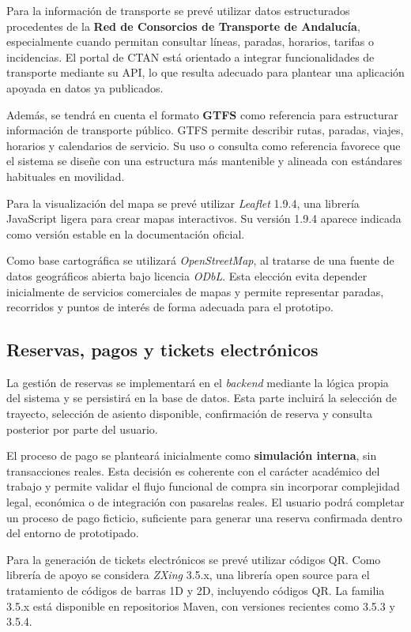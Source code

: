 Para la información de transporte se prevé utilizar datos estructurados procedentes de la \textbf{Red de Consorcios de Transporte de Andalucía}, especialmente cuando permitan consultar líneas, paradas, horarios, tarifas o incidencias. El portal de CTAN está orientado a integrar funcionalidades de transporte mediante su API, lo que resulta adecuado para plantear una aplicación apoyada en datos ya publicados.

Además, se tendrá en cuenta el formato \textbf{GTFS} como referencia para estructurar información de transporte público. GTFS permite describir rutas, paradas, viajes, horarios y calendarios de servicio. Su uso o consulta como referencia favorece que el sistema se diseñe con una estructura más mantenible y alineada con estándares habituales en movilidad.

Para la visualización del mapa se prevé utilizar \textit{Leaflet} 1.9.4, una librería JavaScript ligera para crear mapas interactivos. Su versión 1.9.4 aparece indicada como versión estable en la documentación oficial.

Como base cartográfica se utilizará \textit{OpenStreetMap}, al tratarse de una fuente de datos geográficos abierta bajo licencia \textit{ODbL}. Esta elección evita depender inicialmente de servicios comerciales de mapas y permite representar paradas, recorridos y puntos de interés de forma adecuada para el prototipo.

\subsection{Reservas, pagos y tickets electrónicos}

La gestión de reservas se implementará en el \textit{backend} mediante la lógica propia del sistema y se persistirá en la base de datos. Esta parte incluirá la selección de trayecto, selección de asiento disponible, confirmación de reserva y consulta posterior por parte del usuario.

El proceso de pago se planteará inicialmente como \textbf{simulación interna}, sin transacciones reales. Esta decisión es coherente con el carácter académico del trabajo y permite validar el flujo funcional de compra sin incorporar complejidad legal, económica o de integración con pasarelas reales. El usuario podrá completar un proceso de pago ficticio, suficiente para generar una reserva confirmada dentro del entorno de prototipado.

Para la generación de tickets electrónicos se prevé utilizar códigos QR. Como librería de apoyo se considera \textit{ZXing} 3.5.x, una librería open source para el tratamiento de códigos de barras 1D y 2D, incluyendo códigos QR. La familia 3.5.x está disponible en repositorios Maven, con versiones recientes como 3.5.3 y 3.5.4.

